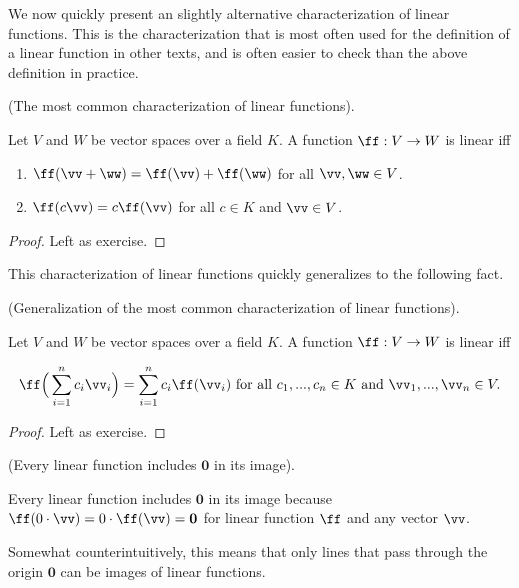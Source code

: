 We now quickly present an slightly alternative characterization of linear functions. This is the characterization that is most often used for the definition of a linear function in other texts, and is often easier to check than the above definition in practice.

\begin{theorem}
    (The most common characterization of linear functions).
    
    Let $V$ and $W$ be vector spaces over a field $K$. A function $\ff:V \rightarrow W$ is linear iff
    
    \begin{enumerate}
        \item $\ff(\vv + \ww) = \ff(\vv) + \ff(\ww)$ for all $\vv, \ww \in V$.
        \item $\ff(c\vv) = c\ff(\vv)$ for all $c \in K$ and $\vv \in V$.
    \end{enumerate}
\end{theorem}

\begin{proof}
   Left as exercise.
\end{proof}

This characterization of linear functions quickly generalizes to the following fact.

\begin{theorem}
    (Generalization of the most common characterization of linear functions).
    
    Let $V$ and $W$ be vector spaces over a field $K$. A function $\ff:V \rightarrow W$ is linear iff
    
    \begin{align*}
        \ff \Big(\sum_{i = 1}^n c_i \vv_i \Big) = \sum_{i = 1}^n c_i \ff(\vv_i) \text{ for all } c_1, ..., c_n \in K \text{ and } \vv_1, ..., \vv_n \in V.
    \end{align*}
\end{theorem}

\begin{proof}
    Left as exercise.
\end{proof}

\begin{theorem}
    \label{ch::lin_alg::thm::linear_functions_have_zero_in_image}
    (Every linear function includes $\mathbf{0}$ in its image).
    
    Every linear function includes $\mathbf{0}$ in its image because $\ff(0 \cdot \vv) = 0 \cdot \ff(\vv) = \mathbf{0}$ for linear function $\ff$ and any vector $\vv$.
    
    Somewhat counterintuitively, this means that only lines that pass through the origin $\mathbf{0}$ can be images of linear functions.
\end{theorem}

